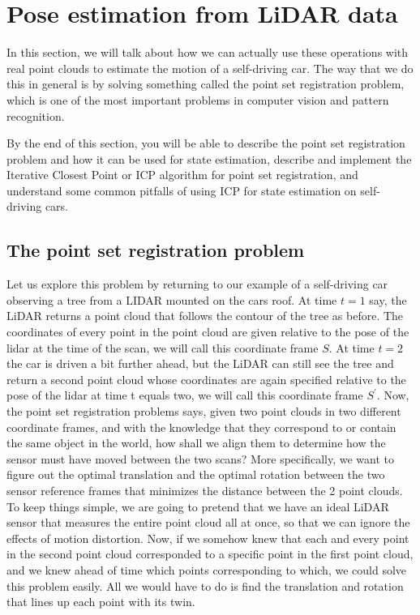 \section{Pose estimation from LiDAR data}

In this section, we will talk
about how we can actually use these operations with real point clouds to estimate the motion of
a self-driving car. The way that we do this in general is by solving something called the point set
registration problem, which is one of
the most important problems in computer vision and
pattern recognition. 

By the end of this section, you will be able to
describe the point set registration problem and how it can be used for
state estimation, describe and implement the Iterative Closest Point or ICP algorithm for
point set registration, and understand some
common pitfalls of using ICP for state estimation
on self-driving cars. 

\subsection{The point set registration problem}
\label{point_set_registration_problem}

Let us explore this problem by returning to our example of a self-driving car observing a tree from a LIDAR
mounted on the cars roof. At time $t=1$ say, the LiDAR returns
a point cloud that follows the contour of
the tree as before.  The coordinates of every point in the point cloud are given relative to the pose of the lidar at the time
of the scan, we will call this
coordinate frame $S$. At time $t=2$ the car is
driven a bit further ahead, but the LiDAR can
still see the tree and return a second point cloud whose coordinates are again
specified relative to the pose of the lidar
at time t equals two, we will call this
coordinate frame $S^{'}$. Now, the point set
registration problems says, given two point clouds in
two different coordinate frames, and with the knowledge that they correspond to or contain the same object
in the world, how shall we align them to
determine how the sensor must have moved
between the two scans? More specifically,
we want to figure out the optimal translation and the optimal rotation between the two sensor
reference frames that minimizes the distance
between the 2 point clouds. To keep things simple, we are going to pretend that
we have an ideal LiDAR sensor that measures the entire point
cloud all at once, so that we can ignore the
effects of motion distortion. Now, if we somehow knew that
each and every point in the second point
cloud corresponded to a specific point in
the first point cloud, and we knew ahead of time which points
corresponding to which, we could solve this
problem easily. All we would have to do is
find the translation and rotation that lines up
each point with its twin. 

